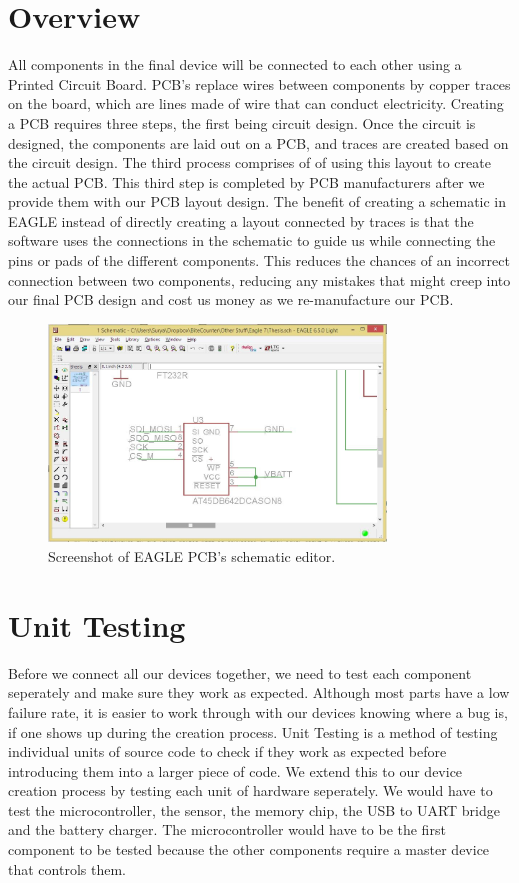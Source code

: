 \section{Overview}
\label{Sec:PCBDesign}
All components in the final device will be connected to each other using a Printed Circuit Board.
PCB's replace wires between components by copper traces on the board,
which are lines made of wire that can conduct electricity.
Creating a PCB requires three steps, the first being circuit design.
Once the circuit is designed, the components are laid out on a PCB, and traces are created based on the circuit design.
The third process comprises of of using this layout to create the actual PCB.
This third step is completed by PCB manufacturers after we provide them with our PCB layout design.
The benefit of creating a schematic in EAGLE instead of directly creating a layout connected by traces
is that the software uses the connections in the schematic to guide us while connecting the pins or pads of the different components.
This reduces the chances of an incorrect connection between two components,
reducing any mistakes that might creep into our final PCB design and cost us money as we re-manufacture our PCB.
\begin{figure}
\begin{center}
\includegraphics[width=0.8\textwidth]{images/EagleScreen.jpg}
\caption{Screenshot of EAGLE PCB's schematic editor.}
\label{Fig:EaglePCBScreen}
\end{center}
\end{figure}

\section{Unit Testing}
\label{Sec:UnitTesting}
Before we connect all our devices together,
we need to test each component seperately and make sure they work as expected.
Although most parts have a low failure rate,
it is easier to work through with our devices knowing where a bug is,
if one shows up during the creation process.
Unit Testing is a method of testing individual units of source code to check if they work as expected before introducing them into a larger piece of code.
We extend this to our device creation process by testing each unit of hardware seperately.
We would have to test the microcontroller, the sensor, the memory chip, the USB to UART bridge and the battery charger.
The microcontroller would have to be the first component to be tested because the other components require a master device that controls them.

